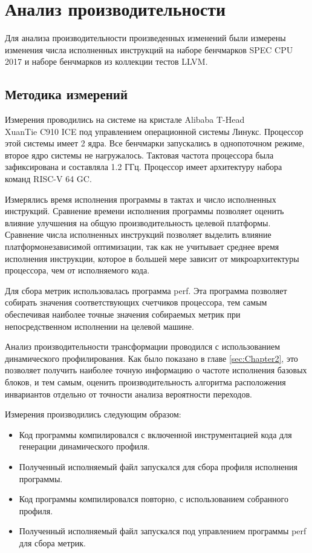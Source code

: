 \section{Анализ производительности}

Для анализа производительности произведенных изменений были измерены изменения числа исполненных инструкций на наборе бенчмарков SPEC CPU\textsuperscript{\tiny\textregistered} 2017 и наборе бенчмарков из коллекции тестов LLVM.

\subsection{Методика измерений}

Измерения проводились на системе на кристале Alibaba T-Head\\XuanTie C910 ICE под управлением операционной системы Линукс.
Процессор этой системы имеет 2 ядра.
Все бенчмарки запускались в однопоточном режиме, второе ядро системы не нагружалось.
Тактовая частота процессора была зафиксирована и составляла 1.2 ГГц.
Процессор имеет архитектуру набора команд RISC-V 64 GC.

Измерялись время исполнения программы в тактах и число исполненных инструкций.
Сравнение времени исполнения программы позволяет оценить влияние улучшения на общую производительность целевой платформы.
Сравнение числа исполненных инструкций позволяет выделить влияние платформонезависимой оптимизации, так как не учитывает среднее время исполнения инструкции, которое в большей мере зависит от микроархитектуры процессора, чем от исполняемого кода.

Для сбора метрик использовалась программа perf.
Эта программа позволяет собирать значения соответствующих счетчиков процессора, тем самым обеспечивая наиболее точные значения собираемых метрик при непосредственном исполнении на целевой машине.

Анализ производительности трансформации проводился с использованием динамического профилирования.
Как было показано в главе \ref{sec:Chapter2}, это позволяет получить наиболее точную информацию о частоте исполнения базовых блоков, и тем самым, оценить производительность алгоритма расположения инвариантов отдельно от точности анализа вероятности переходов.

Измерения производились следующим образом:
\begin{itemize}
    \item Код программы компилировался с включенной инструментацией кода для генерации динамического профиля.
    \item Полученный исполняемый файл запускался для сбора профиля исполнения программы.
    \item Код программы компилировался повторно, с использованием собранного профиля.
    \item Полученный исполняемый файл запускался под управлением программы perf для сбора метрик.
\end{itemize}

